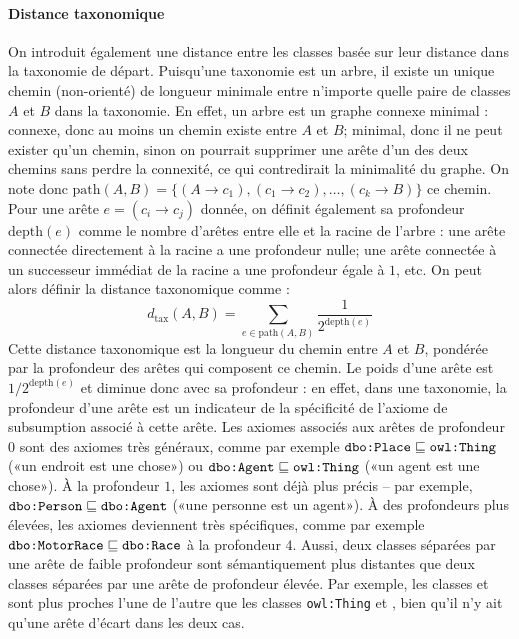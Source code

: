 \paragraph{Distance taxonomique}
On introduit également une distance entre les classes basée sur leur distance dans la taxonomie de départ. Puisqu'une taxonomie est un arbre, il existe un unique chemin (non-orienté) de longueur minimale entre n'importe quelle paire de classes $A$ et $B$ dans la taxonomie. En effet, un arbre est un graphe connexe minimal : connexe, donc au moins un chemin existe entre $A$ et $B$; minimal, donc il ne peut exister qu'un chemin, sinon on pourrait supprimer une arête d'un des deux chemins sans perdre la connexité, ce qui contredirait la minimalité du graphe. On note donc $\text{path}(A, B) = \{(A \rightarrow c_1), (c_1 \rightarrow c_2), \ldots, (c_k \rightarrow B)\}$ ce chemin. Pour une arête $e = (c_i \rightarrow c_j)$ donnée, on définit également sa profondeur $\text{depth}(e)$ comme le nombre d'arêtes entre elle et la racine de l'arbre : une arête connectée directement à la racine a une profondeur nulle; une arête connectée à un successeur immédiat de la racine a une profondeur égale à $1$, etc.
On peut alors définir la distance taxonomique comme :
\begin{equation}
    d_\text{tax}(A, B) = \sum_{e \in \text{path}(A, B)} \frac{1}{\displaystyle 2^{\text{depth}(e)}}
\end{equation}
Cette distance taxonomique est la longueur du chemin entre $A$ et $B$, pondérée par la profondeur des arêtes qui composent ce chemin. Le poids d'une arête est $1/2^{\text{depth}(e)}$ et diminue donc avec sa profondeur : en effet, dans une taxonomie, la profondeur d'une arête est un indicateur de la spécificité de l'axiome de subsumption associé à cette arête. Les axiomes associés aux arêtes de profondeur $0$ sont des axiomes très généraux, comme par exemple $\texttt{dbo:Place} \sqsubseteq \texttt{owl:Thing}$ («un endroit est une chose») ou $\texttt{dbo:Agent} \sqsubseteq \texttt{owl:Thing}$ («un agent est une chose»). À la profondeur $1$, les axiomes sont déjà plus précis – par exemple, $\texttt{dbo:Person}\sqsubseteq \texttt{dbo:Agent}$ («une personne est un agent»). À des profondeurs plus élevées, les axiomes deviennent très spécifiques, comme par exemple $\texttt{dbo:MotorRace} \sqsubseteq \texttt{dbo:Race}$ à la profondeur $4$. Aussi, deux classes séparées par une arête de faible profondeur sont sémantiquement plus distantes que deux classes séparées par une arête de profondeur élevée.
Par exemple, les classes  et  sont plus proches l'une de l'autre que les classes \texttt{owl:Thing} et , bien qu'il n'y ait qu'une arête d'écart dans les deux cas.


